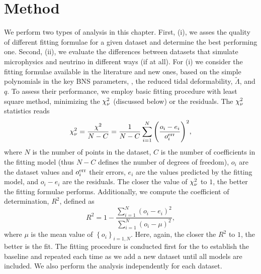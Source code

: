 

\section{Method}

We perform two types of analysis in this chapter.
First, (i), we asses the quality of different fitting formulae for a given
dataset and determine the best performing one.
Second, (ii), we evaluate the differences between datasets that 
simulate microphysics and neutrino in different ways (if at all).
%
For (i) we consider the fitting formulae available in the literature 
and new ones, based on the simple polynomials in the key \ac{BNS} parameters, 
\ie, the reduced tidal deformability, $\tilde{\Lambda}$, and \mr{} $q$. 
%
To assess their performance, we employ basic fitting procedure with least
square method, minimizing the $\chi_{\nu}^2$ (discussed below) or the residuals.
The $\chi_{\nu}^2$ statistics reads
%
\begin{equation}
\chi_{\nu}^{2} = \frac{\chi^2}{N - C} = \frac{1}{N-C}\sum\limits_{i=1}^{N}\Bigg(\frac{o_i - e_i}{o_i ^{\rm err}}\Bigg)^2,
\label{eq:theory:chi2dof}
\end{equation}
%
where $N$ is the number of points in the dataset, $C$ is the number of coefficients 
in the fitting model (thus $N-C$ defines the number of degrees of freedom),
$o_i$ are the dataset values and $o_i ^{\rm err}$ their errors,
$e_i$ are the values predicted by the fitting model, and 
$o_i - e_i$ are the residuals.
%
The closer the value of $\chi_{\nu}^2$ to $1$, the better the fitting 
formulae performs.
%
Additionally, we compute the coefficient of determination, $R^2$,
defined as 
%
\begin{equation}
R^2 = 1 - \frac{\sum\limits_{i=1}^{N}(o_i - e_i)^2}{\sum\limits_{i=1}^{N}(o_i - \mu)^2},
\end{equation}
%
where $\mu$ is the mean value of $\left\{ o_i \right\}_{i=1,N}$.
%
Here, again, the closer the $R^2$ to $1$, the better is the fit. 
%
The fitting procedure is conducted first for the \DSrefset{} to establish
the baseline and repeated each time as we add a new dataset until all models are included.
%
We also perform the analysis independently for each dataset.
%

